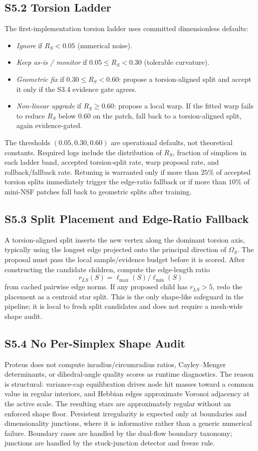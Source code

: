 \documentclass[11pt]{article}
\begin{document}
\subsection*{S5.2 Torsion Ladder}
The first-implementation torsion ladder uses committed dimensionless defaults:
\begin{itemize}[leftmargin=1.5em]
  \item \emph{Ignore} if $R_S<0.05$ (numerical noise).
  \item \emph{Keep as-is / monitor} if $0.05\le R_S<0.30$ (tolerable curvature).
  \item \emph{Geometric fix} if $0.30\le R_S<0.60$: propose a torsion-aligned split and accept it only if the S3.4 evidence gate agrees.
  \item \emph{Non-linear upgrade} if $R_S\ge0.60$: propose a local warp. If the fitted warp fails to reduce $R_S$ below $0.60$ on the patch, fall back to a torsion-aligned split, again evidence-gated.
\end{itemize}
The thresholds $(0.05,0.30,0.60)$ are operational defaults, not theoretical constants. Required logs include the distribution of $R_S$, fraction of simplices in each ladder band, accepted torsion-split rate, warp proposal rate, and rollback/fallback rate. Retuning is warranted only if more than $25\%$ of accepted torsion splits immediately trigger the edge-ratio fallback or if more than $10\%$ of mini-NSF patches fall back to geometric splits after training.

\subsection*{S5.3 Split Placement and Edge-Ratio Fallback}
A torsion-aligned split inserts the new vertex along the dominant torsion axis, typically using the longest edge projected onto the principal direction of $\Omega_S$. The proposal must pass the local sample/evidence budget before it is scored. After constructing the candidate children, compute the edge-length ratio
\[
r_{LS}(S)=\ell_{\max}(S)/\ell_{\min}(S)
\]
from cached pairwise edge norms. If any proposed child has $r_{LS}>5$, redo the placement as a centroid star split. This is the only shape-like safeguard in the pipeline; it is local to fresh split candidates and does not require a mesh-wide shape audit.

\subsection*{S5.4 No Per-Simplex Shape Audit}
Proteus does not compute inradius/circumradius ratios, Cayley--Menger determinants, or dihedral-angle quality scores as runtime diagnostics. The reason is structural: variance-cap equilibration drives node hit masses toward a common value in regular interiors, and Hebbian edges approximate Voronoi adjacency at the active scale. The resulting stars are approximately regular without an enforced shape floor. Persistent irregularity is expected only at boundaries and dimensionality junctions, where it is informative rather than a generic numerical failure. Boundary cases are handled by the dual-flow boundary taxonomy; junctions are handled by the stuck-junction detector and freeze rule.
\end{document}
